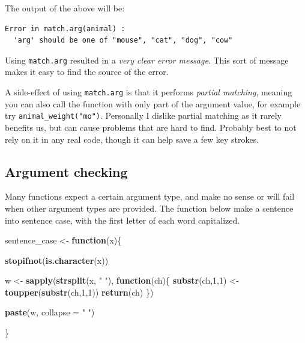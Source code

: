 \documentclass[]{book}
\newenvironment{Shaded}{\begin{snugshade}}{\end{snugshade}}
\newcommand{\ControlFlowTok}[1]{\textcolor[rgb]{0.13,0.29,0.53}{\textbf{#1}}}
\newcommand{\DataTypeTok}[1]{\textcolor[rgb]{0.13,0.29,0.53}{#1}}
\newcommand{\DecValTok}[1]{\textcolor[rgb]{0.00,0.00,0.81}{#1}}
\newcommand{\KeywordTok}[1]{\textcolor[rgb]{0.13,0.29,0.53}{\textbf{#1}}}
\newcommand{\NormalTok}[1]{#1}
\newcommand{\StringTok}[1]{\textcolor[rgb]{0.31,0.60,0.02}{#1}}
\begin{document}
The output of the above will be:

\begin{verbatim}
Error in match.arg(animal) : 
  'arg' should be one of "mouse", "cat", "dog", "cow"
\end{verbatim}

Using \texttt{match.arg} resulted in a \emph{very clear error message}. This sort of message makes it easy to find the source of the error.

A side-effect of using \texttt{match.arg} is that it performs \emph{partial matching}, meaning you can also call the function with only part of the argument value, for example try \texttt{animal\_weight("mo")}. Personally I dislike partial matching as it rarely benefits us, but can cause problems that are hard to find. Probably best to not rely on it in any real code, though it can help save a few key strokes.

\hypertarget{argument-checking}{%
\subsection{Argument checking}\label{argument-checking}}

Many functions expect a certain argument type, and make no sense or will fail when other argument types are provided. The function below make a sentence into sentence case, with the first letter of each word capitalized.

\begin{Shaded}
\begin{Highlighting}[]
\NormalTok{sentence_case <-}\StringTok{ }\ControlFlowTok{function}\NormalTok{(x)\{}
  
  \KeywordTok{stopifnot}\NormalTok{(}\KeywordTok{is.character}\NormalTok{(x))}
  
\NormalTok{  w <-}\StringTok{ }\KeywordTok{sapply}\NormalTok{(}\KeywordTok{strsplit}\NormalTok{(x, }\StringTok{" "}\NormalTok{), }\ControlFlowTok{function}\NormalTok{(ch)\{}
    \KeywordTok{substr}\NormalTok{(ch,}\DecValTok{1}\NormalTok{,}\DecValTok{1}\NormalTok{) <-}\StringTok{ }\KeywordTok{toupper}\NormalTok{(}\KeywordTok{substr}\NormalTok{(ch,}\DecValTok{1}\NormalTok{,}\DecValTok{1}\NormalTok{))  }
    \KeywordTok{return}\NormalTok{(ch)}
\NormalTok{  \})}
  
  \KeywordTok{paste}\NormalTok{(w, }\DataTypeTok{collapse =} \StringTok{" "}\NormalTok{)}
  
\NormalTok{\}}
\end{Highlighting}
\end{Shaded}
\end{document}
